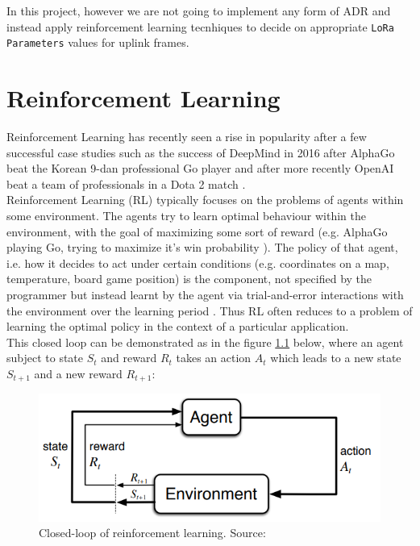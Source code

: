 In this project, however we are not going to implement any form of ADR and instead apply reinforcement learning tecnhiques to 
decide on appropriate \texttt{LoRa Parameters} values for uplink frames.



\chapter{Reinforcement Learning} 

Reinforcement Learning has recently seen a rise in popularity after a few successful case studies such as the success of DeepMind in 2016 after AlphaGo beat the Korean 9-dan professional Go player \cite{alpha_go_lee_sedol} and after more recently OpenAI beat a team of professionals in a Dota 2 match \cite{dota}.\\

Reinforcement Learning (RL) typically focuses on the problems of agents within some environment. The agents try to learn optimal behaviour within the environment, with the goal of maximizing some sort of reward (e.g. AlphaGo playing Go, trying to maximize it's win probability \cite{alpha_go_lee_sedol}). The policy of that agent, i.e. how it decides to act under certain conditions (e.g. coordinates on a map, temperature, board game position) is the component, not specified by the programmer but instead learnt by the agent via trial-and-error interactions with the environment over the learning period \cite{sutton_barto}. Thus RL often reduces to a problem of learning the optimal policy in the context of a particular application.\\

This closed loop can be demonstrated as in the figure \ref{fig:closed_loop} below, where an agent subject to state $S_{t}$
and reward $R_{t}$ takes an action $A_{t}$ which leads to a new
state $S_{t+1}$ and a new reward $R_{t+1}$:

\begin{figure}[h!]
  \centering
  \includegraphics[scale=0.7]{figures/closed_loop.PNG}
  \caption{Closed-loop of reinforcement learning. Source: \cite{sutton_barto}}
  \label{fig:closed_loop}
\end{figure}\\  

